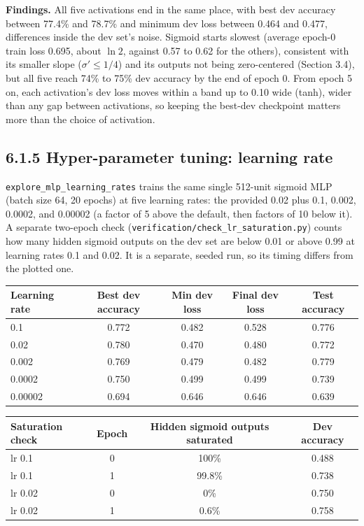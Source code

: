 \textbf{Findings.} All five activations end in the same place, with best dev accuracy between 77.4\% and 78.7\% and minimum dev loss between 0.464 and 0.477, differences inside the dev set's noise. Sigmoid starts slowest (average epoch-0 train loss 0.695, about $\ln 2$, against 0.57 to 0.62 for the others), consistent with its smaller slope ($\sigma'\le 1/4$) and its outputs not being zero-centered (Section 3.4), but all five reach 74\% to 75\% dev accuracy by the end of epoch 0. From epoch 5 on, each activation's dev loss moves within a band up to 0.10 wide (tanh), wider than any gap between activations, so keeping the best-dev checkpoint matters more than the choice of activation.

\subsection*{6.1.5 Hyper-parameter tuning: learning rate}
\texttt{explore\_mlp\_learning\_rates} trains the same single 512-unit sigmoid MLP (batch size 64, 20 epochs) at five learning rates: the provided 0.02 plus 0.1, 0.002, 0.0002, and 0.00002 (a factor of 5 above the default, then factors of 10 below it). A separate two-epoch check (\texttt{verification/}\allowbreak\texttt{check\_lr\_saturation.py}) counts how many hidden sigmoid outputs on the dev set are below 0.01 or above 0.99 at learning rates 0.1 and 0.02. It is a separate, seeded run, so its timing differs from the plotted one.

\begin{center}\small
\begin{tabular}{lcccc}
\toprule
Learning rate & Best dev accuracy & Min dev loss & Final dev loss & Test accuracy\\
\midrule
0.1 & 0.772 & 0.482 & 0.528 & 0.776\\
0.02 & 0.780 & 0.470 & 0.480 & 0.772\\
0.002 & 0.769 & 0.479 & 0.482 & 0.779\\
0.0002 & 0.750 & 0.499 & 0.499 & 0.739\\
0.00002 & 0.694 & 0.646 & 0.646 & 0.639\\
\bottomrule
\end{tabular}

\vspace{6pt}
\begin{tabular}{lccc}
\toprule
Saturation check & Epoch & Hidden sigmoid outputs saturated & Dev accuracy\\
\midrule
lr 0.1 & 0 & 100\% & 0.488\\
lr 0.1 & 1 & 99.8\% & 0.738\\
lr 0.02 & 0 & 0\% & 0.750\\
lr 0.02 & 1 & 0.6\% & 0.758\\
\bottomrule
\end{tabular}
\end{center}

